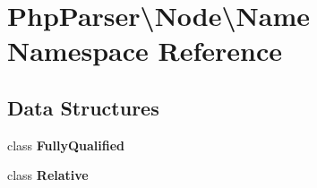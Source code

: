 \section{Php\+Parser\textbackslash{}Node\textbackslash{}Name Namespace Reference}
\label{namespace_php_parser_1_1_node_1_1_name}
\subsection*{Data Structures}
\begin{DoxyCompactItemize}
\item 
class {\bf Fully\+Qualified}
\item 
class {\bf Relative}
\end{DoxyCompactItemize}
